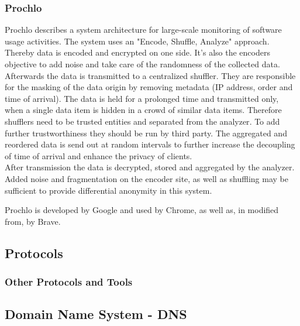 \subsubsection{Prochlo}
    Prochlo describes a system architecture for large-scale monitoring of software usage activities. The system uses an "Encode, Shuffle, Analyze" approach. Thereby data is encoded and encrypted on one side. It's also the encoders objective to add noise and take care of the randomness of the collected data\cite{bittau_prochlo_2017}.\\
    Afterwards the data is transmitted to a centralized shuffler. They are responsible for the masking of the data origin by removing metadata (IP address, order and time of arrival).
    The data is held for a prolonged time and transmitted only, when a single data item is hidden in a crowd of similar data items. Therefore shufflers need to be trusted entities and separated from the analyzer\cite{bittau_prochlo_2017}. To add further trustworthiness they should be run by third party. The aggregated and reordered data is send out at random intervals to further increase the decoupling of time of arrival and enhance the privacy of clients.\\
    After transmission the data is decrypted, stored and aggregated by the analyzer. 
    Added noise and fragmentation on the encoder site, as well as shuffling may be sufficient to provide differential anonymity in this system.
    
    Prochlo is developed by Google and used by Chrome, as well as, in modified from, by Brave.

%
%
\subsection{Protocols}
\label{subsec:related:protocols}
%

\subsubsection{Other Protocols and Tools}


\subsection{Domain Name System - DNS}



